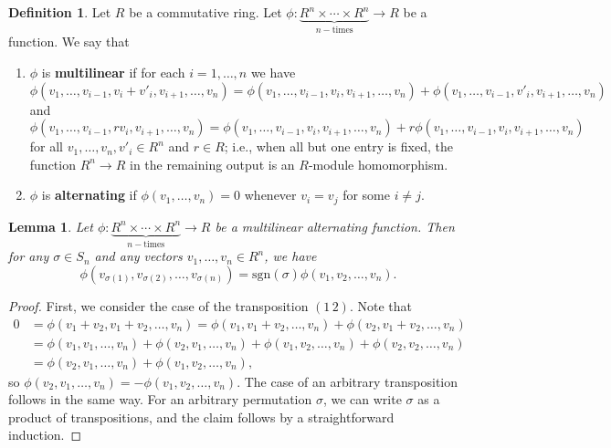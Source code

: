 \documentclass[12pt]{report}
\newtheorem{lemma}[theorem]{Lemma}
\numberwithin{equation}{section}
\numberwithin{theorem}{chapter}
\theoremstyle{definition}
\newtheorem{definition}[theorem]{Definition}
\newtheorem*{basic properties}{Basic Properties}
\newtheorem*{Important Remark}{Important Remark}
\begin{document}
\begin{definition} Let $R$ be a commutative ring. Let $\phi: \underbrace{R^n \times \cdots \times R^n}_{n-\text{times}} \to R$ be a function. We say that
\begin{enumerate}
\item  $\phi$ is \textbf{multilinear} if for each $i=1,\dots,n$ we have
\[ \phi( v_1,\dots,v_{i-1},  v_i + v'_i, v_{i+1},\dots, v_n) = \phi( v_1,\dots,v_{i-1},  v_i, v_{i+1},\dots, v_n) + \phi( v_1,\dots,v_{i-1},  v'_i, v_{i+1},\dots, v_n)\]
and
\[ \phi( v_1,\dots,v_{i-1},  r v_i, v_{i+1},\dots, v_n) = \phi( v_1,\dots,v_{i-1},  v_i, v_{i+1},\dots, v_n) + r \phi( v_1,\dots,v_{i-1},  v_i, v_{i+1},\dots, v_n)\]
for all $v_1,\dots,v_n, v'_i \in R^n$ and $r\in R$; i.e., when all but one entry is fixed, the function $R^n \to R$ in the remaining output is an $R$-module homomorphism.
\item $\phi$ is \textbf{alternating} if $\phi(v_1,\dots,v_n)=0$ whenever $v_i=v_j$ for some $i\neq j$.
\end{enumerate}
\end{definition}

\begin{lemma} Let $\phi: \underbrace{R^n \times \cdots \times R^n}_{n-\text{times}} \to R$ be a multilinear alternating function. Then for any $\sigma\in S_n$ and any vectors $v_1,\dots,v_n\in R^n$, we have
\[ \phi(v_{\sigma(1)}, v_{\sigma(2)},\dots,v_{\sigma(n)}) = \mathrm{sgn}(\sigma) \phi(v_1, v_2,\dots,v_n).\]
\end{lemma}
\begin{proof}
First, we consider the case of the transposition $(1\, 2)$. Note that
\[\begin{aligned} 0 &= \phi(v_1+v_2, v_1+ v_2,\dots,v_n) = \phi(v_1, v_1+ v_2,\dots,v_n) + \phi(v_2, v_1+ v_2,\dots,v_n) \\
& = \phi(v_1, v_1,\dots,v_n) + \phi(v_2, v_1,\dots,v_n) +  \phi(v_1, v_2,\dots,v_n) + \phi(v_2, v_2,\dots,v_n) \\&=   \phi(v_2, v_1,\dots,v_n) +  \phi(v_1, v_2,\dots,v_n) ,\end{aligned}\]
so $ \phi(v_2, v_1,\dots,v_n) =  - \phi(v_1, v_2,\dots,v_n)$. The case of an arbitrary transposition follows in the same way. For an arbitrary permutation $\sigma$, we can write $\sigma$ as a product of transpositions, and the claim follows by a straightforward induction.
\end{proof}
\end{document}
